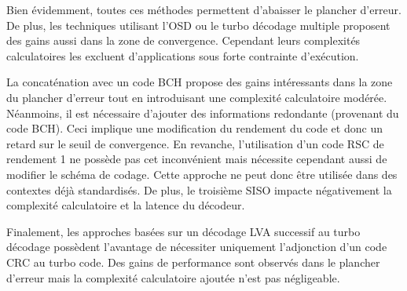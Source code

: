 Bien évidemment, toutes ces méthodes permettent d'abaisser le plancher d'erreur. De plus, les techniques utilisant l'OSD 
ou le turbo décodage multiple proposent des gains aussi dans la zone de convergence. Cependant leurs complexités calculatoires 
les excluent d'applications sous forte contrainte d'exécution. 

La concaténation avec un code BCH propose des gains intéressants dans la zone du plancher d'erreur tout en introduisant une
complexité calculatoire modérée. Néanmoins, il est nécessaire d'ajouter des informations redondante (provenant du code BCH). 
Ceci implique une modification du rendement du code et donc un retard sur le seuil de convergence. 
En revanche, l'utilisation d'un code RSC de rendement 1 ne possède pas cet inconvénient mais nécessite cependant aussi de 
modifier le schéma de codage. Cette approche ne peut donc être utilisée dans des contextes déjà standardisés. De plus, le 
troisième SISO impacte négativement la complexité calculatoire et la latence du décodeur.

Finalement, les approches basées sur un décodage LVA successif au turbo décodage possèdent l'avantage de nécessiter uniquement 
l'adjonction d'un code CRC au turbo code. Des gains de performance sont observés dans le plancher d'erreur mais la complexité 
calculatoire ajoutée n'est pas négligeable.

\begin{table}[tb]
\centering
\caption{Synthèse des différentes méthodes améliorant les performances de décodage}
\label{tab:recap}
\end{table}

